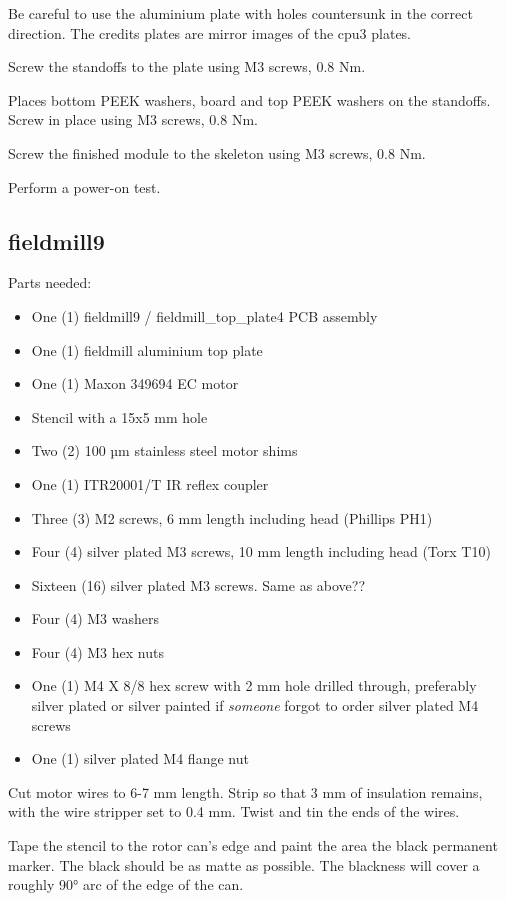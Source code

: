 \documentclass{article}
\begin{document}
Be careful to use the aluminium plate with holes countersunk in the correct direction.
The credits plates are mirror images of the cpu3 plates.

Screw the standoffs to the plate using M3 screws, 0.8 Nm.

Places bottom PEEK washers, board and top PEEK washers on the standoffs.
Screw in place using M3 screws, 0.8 Nm.

Screw the finished module to the skeleton using M3 screws, 0.8 Nm.

Perform a power-on test.

\subsection{fieldmill9}

Parts needed:

\begin{itemize}
\item One (1) fieldmill9 / fieldmill\_top\_plate4 PCB assembly
\item One (1) fieldmill aluminium top plate
\item One (1) Maxon 349694 EC motor
\item Stencil with a 15x5 mm hole
\item Two (2) 100 µm stainless steel motor shims
\item One (1) ITR20001/T IR reflex coupler
\item Three (3) M2 screws, 6 mm length including head (Phillips PH1)
\item Four (4) silver plated M3 screws, 10 mm length including head (Torx T10)
\item Sixteen (16) silver plated M3 screws. Same as above??
\item Four (4) M3 washers
\item Four (4) M3 hex nuts
\item One (1) M4 X 8/8 hex screw with 2 mm hole drilled through, preferably silver plated or silver painted if {\it someone} forgot to order silver plated M4 screws
\item One (1) silver plated M4 flange nut
\end{itemize}

Cut motor wires to 6-7 mm length.
Strip so that 3 mm of insulation remains, with the wire stripper set to 0.4 mm.
Twist and tin the ends of the wires.

Tape the stencil to the rotor can's edge and paint the area the black permanent marker.
The black should be as matte as possible. The blackness will cover a roughly 90° arc of the edge of the can.
\end{document}
